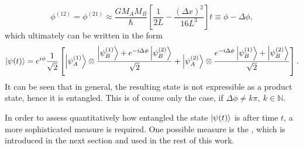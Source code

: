 \begin{equation}\label{eq:2:definition-delta-phi}
  \phi^{(12)} = \phi^{(21)} \approx \frac{GM_AM_B}{\hbar} \left[ \frac{1}{2L} - \frac{(\Delta x)^2}{16 L^3} \right] t \equiv \phi - \Delta\phi ,
\end{equation}
which ultimately can be written in the form
\begin{equation}\label{eq:2:evolved-state-factored}
  \ket{\psi(t)} = e^{i\phi}\frac{1}{\sqrt{2}}\left[ 
    \ket{\psi_A^{(1)}} \otimes \frac{\ket{\psi_B^{(1)}} + e^{-i\Delta\phi} \ket{\psi_B^{(2)}}}{\sqrt{2}}
    + \ket{\psi_A^{(2)}} \otimes \frac{e^{-i\Delta\phi} \ket{\psi_B^{(1)}} + \ket{\psi_B^{(2)}}}{\sqrt{2}} \right] .
\end{equation}
It can be seen that in general, the resulting state is not expressible as a product state, hence it is entangled.
This is of course only the case, if $\Delta \phi \neq k\pi, \ k\in\mathbb{N}$.

In order to assess quantitatively how entangled the state $\ket{\psi(t)}$ is after time $t$, a more sophisticated measure is required. 
One possible measure is the , which is introduced in the next section and used in the rest of this work.